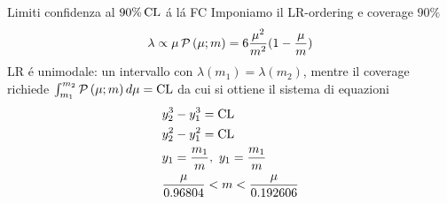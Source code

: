 \documentclass[asd-beamer.tex]{subfiles}
\begin{document}
\begin{frame}{Limiti confidenza al $90\%\operatorname{CL}$ \'a l\'a FC}
Imponiamo il LR-ordering e coverage $90\%$
\begin{equation*}
\lambda\propto\mu\operatorname{\mathcal{P}}{(\mu;m)}=6\frac{\mu^2}{m^2}(1-\frac{\mu}{m})
\end{equation*}
LR \'e unimodale: un intervallo con $\lambda(m_1)=\lambda(m_2)$, mentre il coverage richiede $\int_{m_1}^{m_2}\operatorname{\mathcal{P}}{(\mu;m)}\,d\mu=\operatorname{CL}$ da cui si ottiene il sistema di equazioni
\begin{align*}
&y_2^3-y_1^3=\operatorname{CL}\\
&y_2^2-y_1^2=\operatorname{CL}\\
&y_1=\frac{m_1}{m},\ y_1=\frac{m_1}{m}\\
&\frac{\mu}{0.96804}<m<\frac{\mu}{0.192606}
\end{align*}
\end{frame}
\end{document}
